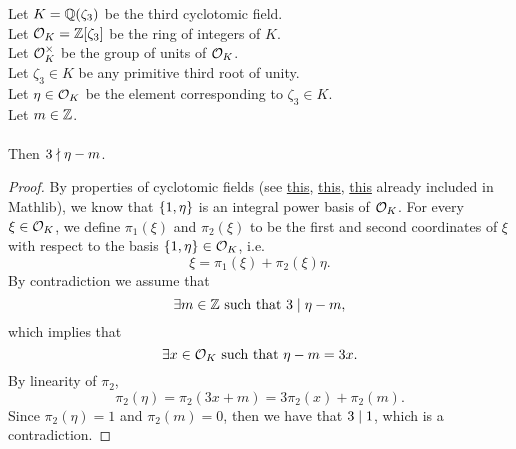 \begin{theorem}
    \label{thm:not_exists_int_three_dvd_sub}
    \leanok
    Let $K = \mathbb{Q}(\zeta_3)$ be the third cyclotomic field. \\
    Let $\mathcal{O}_K = \mathbb{Z}[\zeta_3]$ be the ring of integers of $K$. \\
    Let $\mathcal{O}^\times_K$ be the group of units of $\mathcal{O}_K$. \\
    Let $\zeta_3 \in K$ be any primitive third root of unity. \\
    Let $\eta \in \mathcal{O}_K$ be the element corresponding to $\zeta_3 \in K$. \\
    Let $m \in \mathbb{Z}$. \\\\
    Then $3 \nmid \eta - m$.
\end{theorem}
\begin{proof}
    \leanok
    By properties of cyclotomic fields
    (see \href{https://pitmonticone.github.io/FLT3/docs/FLT3/Mathlib/NumberTheory/Cyclotomic/Rat.html#IsPrimitiveRoot.integralPowerBasis'}{this},
    \href{https://pitmonticone.github.io/FLT3/docs/FLT3/Mathlib/NumberTheory/Cyclotomic/Rat.html#IsPrimitiveRoot.power_basis_int'_dim}{this},
    \href{https://pitmonticone.github.io/FLT3/docs/FLT3/Mathlib/NumberTheory/Cyclotomic/Rat.html#IsPrimitiveRoot.integralPowerBasis'_gen}{this}
    already included in Mathlib),
    we know that $\left\{1,\eta\right\}$ is an integral power basis of $\mathcal{O}_K$.
    For every $\xi \in \mathcal{O}_K$, we define $\pi_1(\xi)$ and $\pi_2(\xi)$ to be the first and second
    coordinates of $\xi$ with respect to the basis $\left\{1,\eta\right\} \in \mathcal{O}_K$, i.e.
    $$\xi = \pi_1(\xi) + \pi_2(\xi)\eta.$$
    By contradiction we assume that
    $$\exists m \in \mathbb{Z} \text{ such that } 3 \mid \eta - m,$$
    which implies that
    $$\exists x \in \mathcal{O}_K \text{ such that } \eta - m = 3 x.$$
    By linearity of $\pi_2$,
    $$\pi_2(\eta) = \pi_2(3x + m) = 3\pi_2(x) + \pi_2(m).$$
    Since $\pi_2(\eta) = 1$ and $\pi_2(m) = 0$, then we have that $3 \mid 1$, which is a contradiction.
\end{proof}

